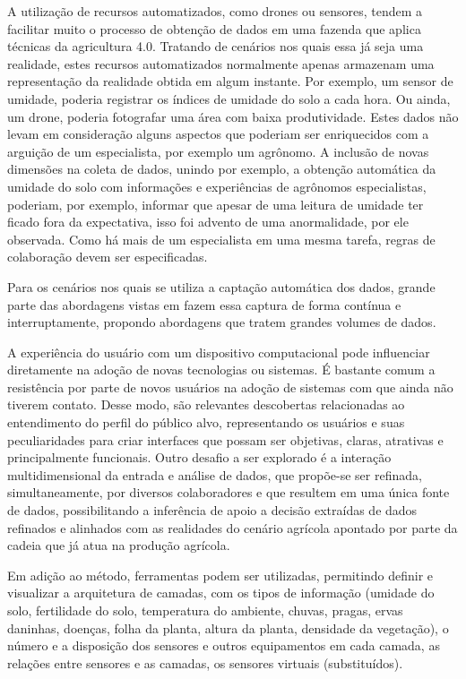 \documentclass[12pt]{article}
\begin{document}
A utilização de recursos automatizados, como drones ou sensores, tendem a facilitar muito o processo de obtenção de dados em uma fazenda que aplica técnicas da agricultura 4.0. Tratando de cenários nos quais essa já seja uma realidade, estes recursos automatizados normalmente apenas armazenam uma representação da realidade obtida em algum instante. Por exemplo, um sensor de umidade, poderia registrar os índices de umidade do solo a cada hora. Ou ainda, um drone, poderia fotografar uma área com baixa produtividade. Estes dados não levam em consideração alguns aspectos que poderiam ser enriquecidos com a arguição de um especialista, por exemplo um agrônomo. A inclusão de novas dimensões na coleta de dados, unindo por exemplo, a obtenção automática da umidade do solo com informações e experiências de agrônomos especialistas, poderiam, por exemplo, informar que apesar de uma leitura de umidade ter ficado fora da expectativa, isso foi advento de uma anormalidade, por ele observada. Como há mais de um especialista em uma mesma tarefa, regras de colaboração devem ser especificadas.

Para os cenários nos quais se utiliza a captação automática dos dados, grande parte das abordagens vistas em \cite{Massruha:2017} fazem essa captura de forma contínua e interruptamente, propondo abordagens que tratem grandes volumes de dados.

A experiência do usuário com um dispositivo computacional pode influenciar diretamente na adoção de novas tecnologias ou sistemas. É bastante comum a resistência por parte de novos usuários na adoção de sistemas com que ainda não tiverem contato. Desse modo, são relevantes descobertas relacionadas ao entendimento do perfil do público alvo, representando os usuários e suas peculiaridades para criar interfaces que possam ser objetivas, claras, atrativas e principalmente funcionais. Outro desafio a ser explorado é a interação multidimensional da entrada e análise de dados, que propõe-se ser refinada, simultaneamente, por diversos colaboradores e que resultem em uma única fonte de dados, possibilitando a inferência de apoio a decisão extraídas de dados refinados e alinhados com as realidades do cenário agrícola apontado por parte da cadeia que já atua na produção agrícola.

Em adição ao método, ferramentas podem ser utilizadas, permitindo definir e visualizar a arquitetura de camadas, com os tipos de informação (umidade do solo, fertilidade do solo, temperatura do ambiente, chuvas, pragas, ervas daninhas, doenças, folha da planta, altura da planta, densidade da vegetação), o número e a disposição dos sensores e outros equipamentos em cada camada, as relações entre sensores e as camadas, os sensores virtuais (substituídos).
\end{document}
